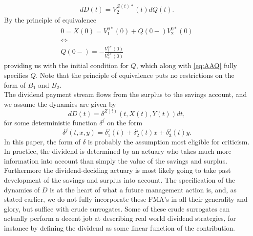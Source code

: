 \documentclass[12pt]{article}
\theoremstyle{my_thm}
\begin{document}
\begin{align}
dD(t)=V_2^{Z(t)*}(t)dQ(t). \label{eq:AAQ}
\end{align}
By the principle of equivalence
\begin{gather*}
0=X(0)=V_1^{0*}(0)+Q(0-)V_2^{0*}(0)
\\
\Leftrightarrow
\\
Q(0-)=-\frac{V_1^{0*}(0)}{V_2^{0*}(0)}
\end{gather*}
providing us with the initial condition for $Q$, which along with \eqref{eq:AAQ} fully specifies $Q$. Note that the principle of equivalence puts no restrictions on the form of $B_1$ and $B_2$.\\
The dividend payment stream flows from the surplus to the savings account, and we assume the dynamics are given by
$$
dD(t)=\delta^{Z(t)}(t,X(t),Y(t)) dt,
$$
for some deterministic function $\delta^j$ on the form
\begin{equation*}
\delta^j(t,x,y)=\delta_1^j(t)+\delta_2^j(t)x+\delta_3^j(t)y.
\end{equation*}
In this paper, the form of $\delta$ is probably the assumption most eligible for criticism. In practice, the dividend is determined by an actuary who takes much more information into account than simply the value of the savings and surplus. Furthermore the dividend-deciding actuary is most likely going to take past development of the savings and surplus into account. The specification of the dynamics of $D$ is at the heart of what a future management action is, and, as stated earlier, we do not fully incorporate these FMA's in all their generality and glory, but suffice with crude surrogates. Some of these crude surrogates can actually perform a decent job at describing real world dividend strategies, for instance by defining the dividend as some linear function of the contribution.






\end{document}
